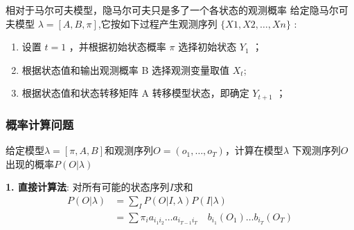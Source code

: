 \documentclass[UTF8]{ctexart}
\begin{document}
相对于马尔可夫模型，隐马尔可夫只是多了一个各状态的观测概率
给定隐马尔可夫模型 $\lambda=[A, B, \pi] $,它按如下过程产生观测序列 $\{X 1, X 2,\ldots, X n\}$ :
\begin{enumerate}
    \item 设置 $t=1$ ，并根据初始状态概率 $\pi$ 选择初始状态 $Y_{1}$ ；
    \item 根据状态值和输出观测概率 B 选择观测变量取值 $X_{t}$;
    \item 根据状态值和状态转移矩阵 $\mathrm{A}$ 转移模型状态，即确定 $Y_{t+1}$ ；
\end{enumerate}

\subsubsection{概率计算问题}
给定模型$\lambda=[\pi, A, B]$和观测序列$O=(o_1,\ldots,o_T)$，计算在模型$\lambda$
下观测序列$O$出现的概率$P(O|\lambda)$

\textbf{1. 直接计算法}:
对所有可能的状态序列$I$求和
$$
\begin{aligned}
    P(O|\lambda)
    &=\sum_I P(O|I,\lambda)P(I|\lambda)\\
    &=\sum \pi_i a_{i_1 i_2}\ldots a_{i_{T-1}i_T} \quad b_{i_1}(O_1)\ldots  b_{i_T}(O_T)
\end{aligned}
$$
\end{document}
